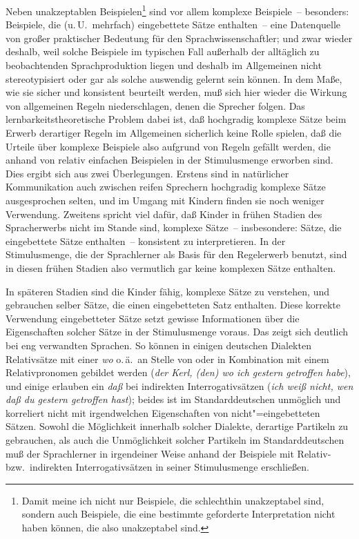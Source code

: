 \documentclass[output=paper]{langsci/langscibook}
\begin{document}
\ssubsubsection{}%
\label{subsubsec:1-7.2.2}

Neben unakzeptablen Beispielen\footnote{%
  Damit meine ich nicht nur Beispiele, die schlechthin unakzeptabel sind, sondern auch Beispiele, die
  eine bestimmte geforderte Interpretation nicht haben können, die also  unakzeptabel sind.%
}
sind vor allem komplexe Beispiele~-- besonders: Beispiele, die (u.\,U.\ mehrfach) eingebettete Sätze enthalten~-- eine Datenquelle von großer praktischer Bedeutung für den Sprachwissenschaftler; und zwar
wieder deshalb, weil solche Beispiele im typischen Fall außerhalb der alltäglich zu
beobachtenden Sprachproduktion liegen und deshalb im Allgemeinen nicht stereotypisiert oder
gar als solche auswendig gelernt sein können. In dem Maße, wie sie sicher und
konsistent beurteilt werden, muß sich hier wieder die Wirkung von allgemeinen Regeln
niederschlagen, denen die Sprecher folgen. Das lernbarkeitstheoretische Problem
dabei ist, daß hochgradig komplexe Sätze beim Erwerb derartiger Regeln im Allgemeinen sicherlich keine Rolle spielen, daß die Urteile über komplexe Beispiele also aufgrund von
Regeln gefällt werden, die anhand von relativ einfachen Beispielen in der Stimulusmenge erworben sind. Dies ergibt sich aus zwei Überlegungen. Erstens sind in
natürlicher Kommunikation auch zwischen reifen Sprechern hochgradig komplexe
Sätze ausgesprochen selten, und im Umgang mit Kindern finden sie noch weniger
Verwendung. Zweitens spricht viel dafür, daß Kinder in frühen Stadien des
Spracherwerbs nicht im Stande sind, komplexe Sätze~-- insbesondere: Sätze, die
eingebettete Sätze enthalten~-- konsistent zu interpretieren. In der Stimulusmenge,
die der Sprachlerner als Basis für den Regelerwerb benutzt, sind in diesen frühen
Stadien also vermutlich gar keine komplexen Sätze enthalten.

In späteren Stadien sind die Kinder fähig, komplexe Sätze zu verstehen, und gebrauchen selber Sätze, die einen eingebetteten Satz enthalten. Diese korrekte Verwendung eingebetteter Sätze setzt gewisse Informationen über die Eigenschaften
solcher Sätze in der Stimulusmenge voraus. Das zeigt sich deutlich bei eng verwandten Sprachen. So können in einigen deutschen Dialekten Relativsätze mit einer
 \textit{wo} o.\,ä.\ an Stelle von oder in Kombination mit einem Relativpronomen
gebildet werden (\zb \textit{der Kerl, (den) wo ich gestern getroffen habe}), und einige erlauben ein \textit{daß} bei indirekten Interrogativsätzen (\zb \textit{ich weiß nicht, wen daß du
gestern getroffen hast}); beides ist im Standarddeutschen unmöglich und korreliert
nicht mit irgendwelchen Eigenschaften von nicht"=eingebetteten Sätzen. Sowohl die
Möglichkeit innerhalb solcher Dialekte, derartige Partikeln zu gebrauchen, als auch
die Unmöglichkeit solcher Partikeln im Standarddeutschen muß der Sprachlerner in
irgendeiner Weise anhand der Beispiele mit Relativ- bzw.\ indirekten Interrogativsätzen in seiner Stimulusmenge erschließen.
\end{document}
